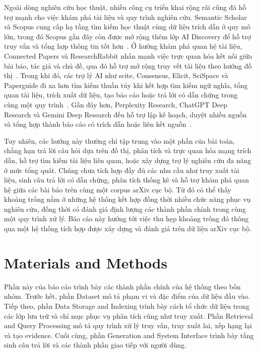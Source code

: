 \documentclass[conference]{IEEEtran}
\begin{document}
Ngoài dòng nghiên cứu học thuật, nhiều công cụ triển khai rộng rãi cũng đã hỗ trợ mạnh cho việc khám phá tài liệu và quy trình nghiên cứu. Semantic Scholar và Scopus cung cấp hạ tầng tìm kiếm học thuật cùng dữ liệu trích dẫn ở quy mô lớn, trong đó Scopus gần đây còn được mở rộng thêm lớp AI Discovery để hỗ trợ truy vấn và tổng hợp thông tin tốt hơn~\cite{semanticScholar2026,scopus2026}. Ở hướng khám phá quan hệ tài liệu, Connected Papers và ResearchRabbit nhấn mạnh việc trực quan hóa kết nối giữa bài báo, tác giả và chủ đề, qua đó hỗ trợ mở rộng truy vết tài liệu theo hướng đồ thị~\cite{connectedPapers2026,researchRabbit2026}. Trong khi đó, các trợ lý AI như scite, Consensus, Elicit, SciSpace và Paperguide đi xa hơn tìm kiếm thuần túy khi kết hợp tìm kiếm ngữ nghĩa, tổng quan tài liệu, trích xuất dữ liệu, tạo báo cáo hoặc trả lời có dẫn chứng trong cùng một quy trình~\cite{scite2026,consensus2026,elicit2026,scispace2026,paperguide2026}. Gần đây hơn, Perplexity Research, ChatGPT Deep Research và Gemini Deep Research đều hỗ trợ lập kế hoạch, duyệt nhiều nguồn và tổng hợp thành báo cáo có trích dẫn hoặc liên kết nguồn~\cite{perplexityResearch2026,chatgptDeepResearch2026,geminiDeepResearch2026}.

Tuy nhiên, các hướng này thường chỉ tập trung vào một phần của bài toán, chẳng hạn trả lời câu hỏi dựa trên đồ thị, phân tích và trực quan hóa mạng trích dẫn, hỗ trợ tìm kiếm tài liệu liên quan, hoặc xây dựng trợ lý nghiên cứu đa năng ở mức tổng quát. Chúng chưa tích hợp đầy đủ các nhu cầu như truy xuất tài liệu, sinh câu trả lời có dẫn chứng, phân tích thống kê và hỗ trợ khám phá quan hệ giữa các bài báo trên cùng một corpus arXiv cục bộ. Từ đó có thể thấy khoảng trống nằm ở những hệ thống kết hợp đồng thời nhiều chức năng phục vụ nghiên cứu, đồng thời có đánh giá định lượng các thành phần chính trong cùng một quy trình xử lý. Báo cáo này hướng tới việc thu hẹp khoảng trống đó thông qua một hệ thống tích hợp được xây dựng và đánh giá trên dữ liệu arXiv cục bộ.

\section{Materials and Methods}

Phần này của báo cáo trình bày các thành phần chính của hệ thống theo bốn nhóm. Trước hết, phần Dataset mô tả phạm vi và đặc điểm của dữ liệu đầu vào. Tiếp theo, phần Data Storage and Indexing trình bày cách tổ chức dữ liệu trong các lớp lưu trữ và chỉ mục phục vụ phân tích cũng như truy xuất. Phần Retrieval and Query Processing mô tả quy trình xử lý truy vấn, truy xuất lai, xếp hạng lại và tạo evidence. Cuối cùng, phần Generation and System Interface trình bày tầng sinh câu trả lời và các thành phần giao tiếp với người dùng.
\end{document}
